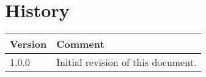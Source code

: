 \chapter{History}

\begin{tabular}{|p{}|p{}|}
\hline 
Version&
Comment\tabularnewline
\hline
\hline 
1.0.0&
Initial revision of this document.
\tabularnewline
\hline 
\end{tabular}
